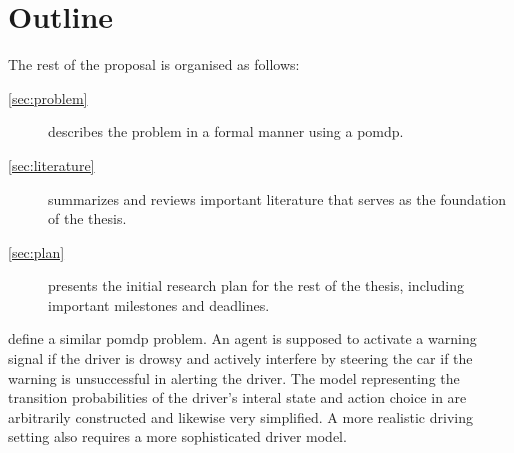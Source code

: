 \section*{Outline}

The rest of the proposal is organised as follows:
\begin{description}
    \item[\cref{sec:problem}]
    describes the problem in a formal manner using a \gls{pomdp}.
    
    \item[\cref{sec:literature}]
    summarizes and reviews important literature that serves as the foundation of the thesis.
    
    \item[\cref{sec:plan}]
    presents the initial research plan for the rest of the thesis, including important milestones and deadlines.
\end{description}


\iffalse

\cite{hitl_pomdp} define a similar \gls{pomdp} problem. An agent is supposed to activate a warning signal if the driver is drowsy and actively interfere by steering the car if the warning is unsuccessful in alerting the driver. The model representing the transition probabilities of the driver's interal state and action choice in \cite{hitl_pomdp} are arbitrarily constructed and likewise very simplified. A more realistic driving setting also requires a more sophisticated driver model. 





